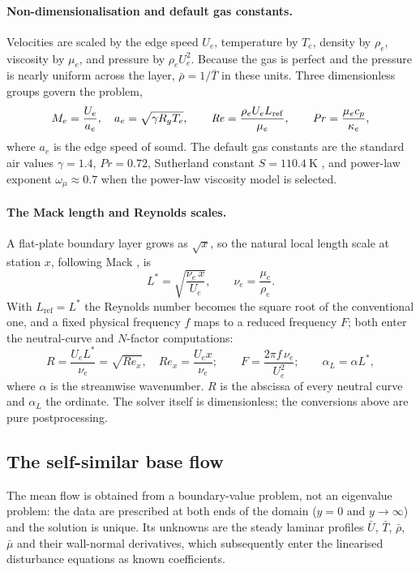\documentclass[11pt]{article}
\begin{document}
\paragraph{Non-dimensionalisation and default gas constants.} Velocities are scaled by the edge speed
$U_e$, temperature by $T_e$, density by $\rho_e$, viscosity by $\mu_e$, and pressure by $\rho_e U_e^2$.
Because the gas is perfect and the pressure is nearly uniform across the layer, $\bar\rho=1/\bar T$ in
these units. Three dimensionless groups govern the problem,
\begin{equation}\label{eq:groups}
  M_e=\frac{U_e}{a_e},\quad a_e=\sqrt{\gamma R_g T_e},\qquad
  \mathit{Re}=\frac{\rho_e U_e L_{\mathrm{ref}}}{\mu_e},\qquad
  \mathit{Pr}=\frac{\mu_e c_p}{\kappa_e},
\end{equation}
where $a_e$ is the edge speed of sound. The default gas constants are the standard air values
$\gamma=1.4$, $\mathit{Pr}=0.72$, Sutherland constant $S=110.4~\mathrm K$ \cite{sutherland1893}, and
power-law exponent $\omega_\mu\approx0.7$ when the power-law viscosity model is selected.

\paragraph{The Mack length and Reynolds scales.}\label{sec:Lstar} A flat-plate boundary layer grows as
$\sqrt x$, so the natural local length scale at station $x$, following Mack \cite{mack1984}, is
\begin{equation}\label{eq:Lstar}
  L^*=\sqrt{\frac{\nu_e\,x}{U_e}},\qquad \nu_e=\frac{\mu_e}{\rho_e}.
\end{equation}
With $L_{\mathrm{ref}}=L^*$ the Reynolds number becomes the square root of the conventional one, and a
fixed physical frequency $f$ maps to a reduced frequency $F$; both enter the neutral-curve and $N$-factor
computations:
\begin{equation}\label{eq:RF}
  R=\frac{U_eL^*}{\nu_e}=\sqrt{Re_x},\quad Re_x=\frac{U_ex}{\nu_e};\qquad
  F=\frac{2\pi f\,\nu_e}{U_e^2};\qquad \alpha_L=\alpha L^* ,
\end{equation}
where $\alpha$ is the streamwise wavenumber. $R$ is the abscissa of every neutral curve and $\alpha_L$
the ordinate. The solver itself is dimensionless; the conversions above are pure postprocessing.

\subsection{The self-similar base flow}\label{sec:base}
The mean flow is obtained from a boundary-value problem, not an eigenvalue problem: the data are
prescribed at both ends of the domain ($y=0$ and $y\to\infty$) and the solution is unique. Its unknowns
are the steady laminar profiles $\bar U$, $\bar T$, $\bar\rho$, $\bar\mu$ and their wall-normal
derivatives, which subsequently enter the linearised disturbance equations as known coefficients.
\end{document}
